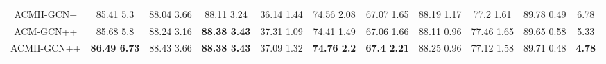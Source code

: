 \documentclass{article}
\newcommand{\0}{{\boldsymbol{0}}}
\newcommand{\6}{{\partial}}
\newcommand{\8}{{\infty}}
\newcommand{\4}{{\nabla}}
\begin{document}
\begin{table}[htbp]
{\begin{tabular}{c|ccccccccc|c}
    ACMII-GCN+ & 85.41  5.3 & 88.04  3.66 & 88.11  3.24 & 36.14  1.44 & 74.56  2.08 & 67.07  1.65 & 88.19  1.17 & 77.2  1.61 & 89.78  0.49  & 6.78 \\
    ACM-GCN++ & 85.68  5.8 & 88.24  3.16 & \cellcolor[rgb]{ .816,  .808,  .808}\textbf{88.38  3.43} & 37.31  1.09 & 74.41  1.49 & 67.06  1.66 & 88.11  0.96 & 77.46  1.65 & 89.65  0.58 & 5.33 \\
    ACMII-GCN++ & \cellcolor[rgb]{ .816,  .808,  .808}\textbf{86.49  6.73} & 88.43  3.66 & \cellcolor[rgb]{ .816,  .808,  .808}\textbf{88.38  3.43} & 37.09  1.32 & \cellcolor[rgb]{ .816,  .808,  .808}\textbf{74.76  2.2} & \cellcolor[rgb]{ .816,  .808,  .808}\textbf{67.4  2.21} & 88.25  0.96 & 77.12  1.58 & 89.71  0.48 & \cellcolor[rgb]{ .816,  .808,  .808}\textbf{4.78} \\
    \bottomrule
    \bottomrule
    \end{tabular}}
  \label{tab:performance_comparison_fixed_splits}\end{table} 
\end{document}
